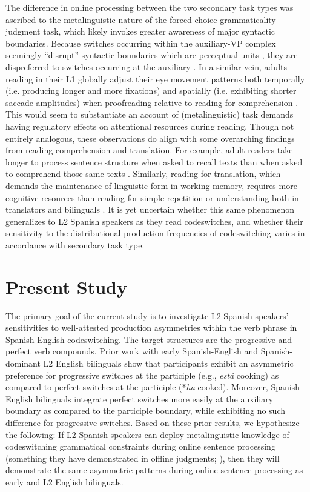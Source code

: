 \documentclass[output=paper,colorlinks,citecolor=brown]{langscibook}
\begin{document}
The difference in online processing between the two secondary task types was ascribed to the metalinguistic nature of the forced-choice grammaticality judgment task, which likely invokes greater awareness of major syntactic boundaries. Because switches occurring within the auxiliary-VP complex seemingly ``disrupt'' syntactic boundaries which are perceptual units \citep{Fodor1965}, they are dispreferred to switches occurring at the auxiliary \citep{ValdesKroffetal2018}. In a similar vein, adults reading in their L1 globally adjust their eye movement patterns both temporally (i.e. producing longer and more fixations) and spatially (i.e. exhibiting shorter saccade amplitudes) when proofreading relative to reading for comprehension \citep{Kaakinen2010}. This would seem to substantiate an account of (metalinguistic) task demands having regulatory effects on attentional resources during reading. Though not entirely analogous, these observations do align with some overarching findings from reading comprehension and translation. For example, adult readers take longer to process sentence structure when asked to recall texts than when asked to comprehend those same texts \citep{Aaronson1986}. Similarly, reading for translation, which demands the maintenance of linguistic form in working memory, requires more cognitive resources than reading for simple repetition or understanding both in translators and bilinguals \citep{MacizoBajo2006}. It is yet uncertain whether this same phenomenon generalizes to L2 Spanish speakers as they read codeswitches, and whether their sensitivity to the distributional production frequencies of codeswitching varies in accordance with secondary task type.

\section{Present Study}
The primary goal of the current study is to investigate L2 Spanish speakers’ sensitivities to well-attested production asymmetries within the verb phrase in Spanish-English codeswitching. The target structures are the progressive and perfect verb compounds. Prior work with early Spanish-English and Spanish-dominant L2 English bilinguals show that participants exhibit an asymmetric preference for progressive switches at the participle (e.g., \textit{est\'a} cooking) as compared to perfect switches at the participle (*\textit{ha} cooked). Moreover, Spanish-English bilinguals integrate perfect switches more easily at the auxiliary boundary as compared to the participle boundary, while exhibiting no such difference for progressive switches. Based on these prior results, we hypothesize the following: If L2 Spanish speakers can deploy metalinguistic knowledge of codeswitching grammatical constraints during online sentence processing (something they have demonstrated in offline judgments; \cite{Giancaspro2015}), then they will demonstrate the same asymmetric patterns during online sentence processing as early and L2 English bilinguals.
\end{document}
